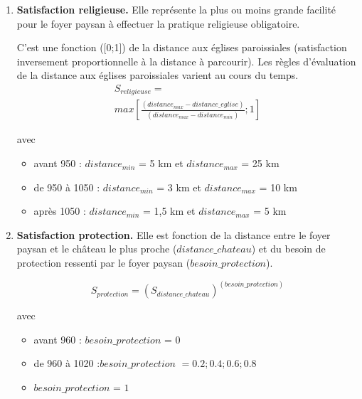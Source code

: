 \documentclass[a4paper,11pt]{article}
\begin{document}
{\begin{enumerate}
avec le paramètre \textit{coef\_redevances} égal à 15 pour la Touraine et la variable \textit{redevances\_acquittées} $∈ [0,n]$.

\bigskip

  \item \textbf{Satisfaction religieuse.} Elle représente la plus ou moins grande facilité pour le foyer paysan à effectuer la pratique religieuse obligatoire.
  
C'est une fonction ([0;1]) de la distance aux églises paroissiales (satisfaction inversement proportionnelle à la distance à parcourir). Les règles d'évaluation de la distance aux églises paroissiales varient au cours du temps.
\begin{equation}
\begin{gathered}
S_{religieuse} = \\max \left \lbrack \frac{(distance_{max} - distance\_eglise)}{(distance_{max} -distance_{min})}; 1 \right \rbrack
\end{gathered}
\end{equation}

avec
\begin{itemize}
	\item avant 950 : $distance_{min}$ = 5 km et $distance_{max}$ =  25 km
	\item de 950 à 1050 : $distance_{min}$ = 3 km et $distance_{max}$ =  10 km
	\item après 1050 : $distance_{min}$ = 1,5 km et $distance_{max}$ =  5 km
\end{itemize}

\bigskip
  
  \item \textbf{Satisfaction protection.} Elle est fonction de la distance entre le foyer paysan et le château le plus proche ($distance\_chateau$) et du besoin de protection ressenti par le foyer paysan ($besoin\_protection$).

\begin{equation}
S_{protection} = (S_{distance\_chateau})^{(besoin\_protection)}
\end{equation}

avec
\begin{itemize}
	\item avant 960 : $besoin\_protection$ = 0
	\item de 960 à 1020 :$besoin\_protection$ $= 0.2 ; 0.4 ; 0.6 ; 0.8$
	\item $besoin\_protection$ = $1$
\end{itemize}


\end{enumerate}}
\end{document}
